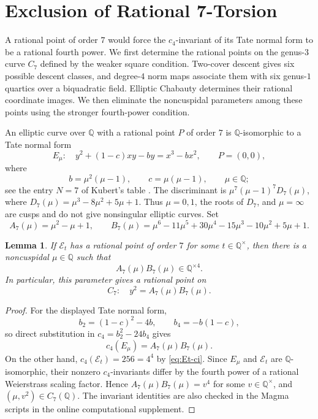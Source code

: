 \documentclass[11pt,a4paper]{amsart}
\newtheorem{lemma}[theorem]{Lemma}
\theoremstyle{definition}
\theoremstyle{remark}
\numberwithin{equation}{section}
\newcommand{\Q}{\mathbb{Q}}
\newcommand{\mathcalE}{\mathcal{E}}
\begin{document}
\section{Exclusion of Rational 7-Torsion}\label{sec:torsion-7}

A rational point of order $7$ would force the $c_4$-invariant of its
Tate normal form to be a rational fourth power. We first determine the
rational points on the genus-$3$ curve $C_7$ defined by the weaker
square condition.
Two-cover descent gives six possible descent classes, and degree-$4$
norm maps associate them with six genus-$1$ quartics over a biquadratic
field. Elliptic Chabauty determines their rational coordinate images.
We then eliminate the noncuspidal parameters among these points using
the stronger fourth-power condition.

An elliptic curve over $\Q$ with a rational point $P$ of order $7$ is
$\Q$-isomorphic to a Tate normal form
\[
E_\mu:\quad y^2+(1-c)xy-by=x^3-bx^2,\qquad P=(0,0),
\]
where
\[
b=\mu^2(\mu-1),\qquad c=\mu(\mu-1),\qquad \mu\in\Q;
\]
see the entry $N=7$ of Kubert's table \cite[Table~1]{kubert1976universal}.
The discriminant is $\mu^7(\mu-1)^7D_7(\mu)$, where
$D_7(\mu)=\mu^3-8\mu^2+5\mu+1$. Thus $\mu=0,1$, the roots of $D_7$,
and $\mu=\infty$ are cusps and do not give nonsingular elliptic curves.
Set
\[
A_7(\mu)=\mu^2-\mu+1,\qquad
B_7(\mu)=\mu^6-11\mu^5+30\mu^4-15\mu^3-10\mu^2+5\mu+1.
\]

\begin{lemma}\label{lem:7torsion-fourth-power}
If $\mathcalE_t$ has a rational point of order $7$ for some
$t\in\Q^\times$, then there is a noncuspidal $\mu\in\Q$ such that
\begin{equation}\label{eq:7torsion-fourth-power}
A_7(\mu)B_7(\mu)\in\Q^{\times4}.
\end{equation}
In particular, this parameter gives a rational point on
\begin{equation}\label{eq:7torsion-C7}
C_7:\quad y^2=A_7(\mu)B_7(\mu).
\end{equation}
\end{lemma}

\begin{proof}
For the displayed Tate normal form,
\[
b_2=(1-c)^2-4b,\qquad b_4=-b(1-c),
\]
so direct substitution in $c_4=b_2^2-24b_4$ gives
\[
c_4(E_\mu)=A_7(\mu)B_7(\mu).
\]
On the other hand, $c_4(\mathcalE_t)=256=4^4$ by
\eqref{eq:Et-ci}. Since $E_\mu$ and $\mathcalE_t$ are
$\Q$-isomorphic, their nonzero $c_4$-invariants differ by the fourth
power of a rational Weierstrass scaling factor. Hence
$A_7(\mu)B_7(\mu)=v^4$ for some $v\in\Q^\times$, and
$(\mu,v^2)\in C_7(\Q)$. The invariant identities are also checked in
the Magma scripts in the online computational supplement.
\end{proof}
\end{document}
